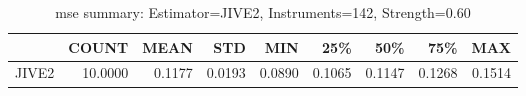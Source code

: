 \begin{table}[ht]
\centering
\caption{mse summary: Estimator=JIVE2, Instruments=142, Strength=0.60}
\begin{tabular}{lrrrrrrrr}
\toprule
 & COUNT & MEAN & STD & MIN & 25\% & 50\% & 75\% & MAX \\
\midrule
JIVE2 & 10.0000 & 0.1177 & 0.0193 & 0.0890 & 0.1065 & 0.1147 & 0.1268 & 0.1514 \\
\bottomrule
\end{tabular}
\end{table}
